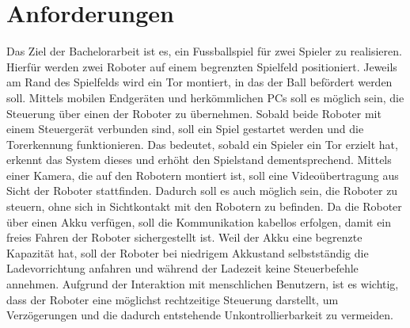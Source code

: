 \section{Anforderungen}
Das Ziel der Bachelorarbeit ist es, ein Fussballspiel für zwei Spieler zu realisieren. Hierfür werden zwei Roboter auf einem begrenzten Spielfeld positioniert. Jeweils am Rand des Spielfelds wird ein Tor montiert, in das der Ball befördert werden soll. Mittels mobilen Endgeräten und herkömmlichen PCs soll es möglich sein, die Steuerung über einen der Roboter zu übernehmen. Sobald beide Roboter mit einem Steuergerät verbunden sind, soll ein Spiel gestartet werden und die Torerkennung funktionieren. Das bedeutet, sobald ein Spieler ein Tor erzielt hat, erkennt das System dieses und erhöht den Spielstand dementsprechend. Mittels einer Kamera, die auf den Robotern montiert ist, soll eine Videoübertragung aus Sicht der Roboter stattfinden. Dadurch soll es auch möglich sein, die Roboter zu steuern, ohne sich in Sichtkontakt mit den Robotern zu befinden. Da die Roboter über einen Akku verfügen, soll die Kommunikation kabellos erfolgen, damit ein freies Fahren der Roboter sichergestellt ist. Weil der Akku eine begrenzte Kapazität hat, soll der Roboter bei niedrigem Akkustand selbstständig die Ladevorrichtung anfahren und während der Ladezeit keine Steuerbefehle annehmen. Aufgrund der Interaktion mit menschlichen Benutzern, ist es wichtig, dass der Roboter eine möglichst rechtzeitige Steuerung darstellt, um Verzögerungen und die dadurch entstehende Unkontrollierbarkeit zu vermeiden.
